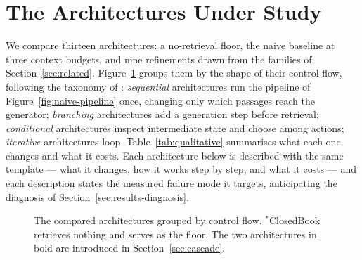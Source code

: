 \section{The Architectures Under Study}
\label{sec:architectures}

We compare thirteen architectures: a no-retrieval floor, the naive
baseline at three context budgets, and nine refinements drawn from the
families of Section~\ref{sec:related}. Figure~\ref{fig:taxonomy} groups
them by the shape of their control flow, following the taxonomy of
\cite{jin2024flashrag}: \emph{sequential} architectures run the pipeline of
Figure~\ref{fig:naive-pipeline} once, changing only which passages reach
the generator; \emph{branching} architectures add a generation step before
retrieval; \emph{conditional} architectures inspect intermediate state and
choose among actions; \emph{iterative} architectures loop.
Table~\ref{tab:qualitative} summarises what each one changes and what it
costs. Each architecture below is described with the same template ---
what it changes, how it works step by step, and what it costs --- and each
description states the measured failure mode it targets, anticipating the
diagnosis of Section~\ref{sec:results-diagnosis}.

\begin{figure}[t]
\centering
{}
\caption{The compared architectures grouped by control flow.
$^{*}$ClosedBook retrieves nothing and serves as the floor. The two
architectures in bold are introduced in Section~\ref{sec:cascade}.}
\label{fig:taxonomy}
\end{figure}


